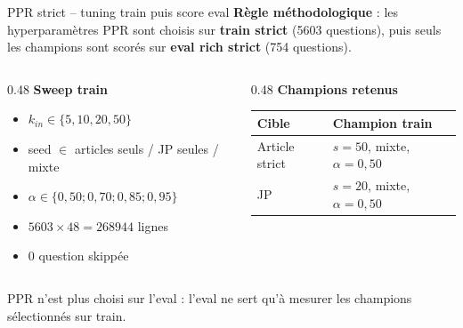 \documentclass[aspectratio=169,10pt]{beamer}
\newcommand{\keybox}[1]{%
  \begin{center}
  \colorbox{accentsoft}{\parbox{0.92\linewidth}{\centering #1}}
  \end{center}}
\begin{document}
\begin{frame}{PPR strict -- tuning train puis score eval}
  \scriptsize
  \textbf{Règle méthodologique} : les hyperparamètres PPR sont choisis sur
  \textbf{train strict} (5603 questions), puis seuls les champions sont scorés sur
  \textbf{eval rich strict} (754 questions).

  \vspace{0.45em}
  \begin{columns}[T,onlytextwidth]
    \begin{column}{0.48\textwidth}
      \textbf{\color{accent}Sweep train}
      \begin{itemize}\setlength{\itemsep}{0.3em}
        \item $k_{in} \in \{5,10,20,50\}$
        \item seed $\in$ articles seuls / JP seules / mixte
        \item $\alpha \in \{0{,}50;0{,}70;0{,}85;0{,}95\}$
        \item $5603 \times 48 = 268944$ lignes
        \item 0 question skippée
      \end{itemize}
    \end{column}
    \begin{column}{0.48\textwidth}
      \textbf{\color{ok}Champions retenus}
      \begin{center}
      \renewcommand{\arraystretch}{1.12}
      \setlength{\tabcolsep}{4pt}
      \begin{tabular}{@{}l l@{}}
        \toprule
        \textbf{Cible} & \textbf{Champion train} \\
        \midrule
        Article strict & $s=50$, mixte, $\alpha=0{,}50$ \\
        JP & $s=20$, mixte, $\alpha=0{,}50$ \\
        \bottomrule
      \end{tabular}
      \end{center}
    \end{column}
  \end{columns}

  \vspace{0.45em}
  \keybox{\scriptsize PPR n'est plus choisi sur l'eval : l'eval ne sert qu'à mesurer
  les champions sélectionnés sur train.}
\end{frame}
\end{document}
